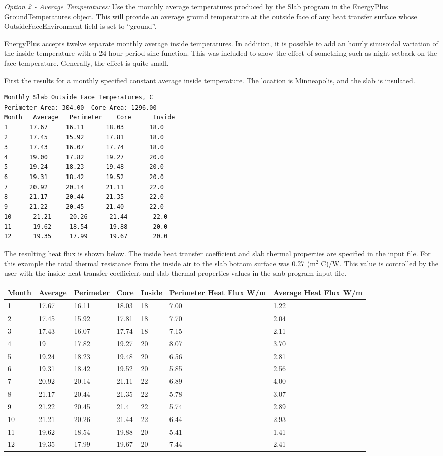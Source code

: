\emph{Option 2 - Average Temperatures:} Use the monthly average temperatures produced by the Slab program in the EnergyPlus GroundTemperatures object. This will provide an average ground temperature at the outside face of any heat transfer surface whose OutsideFaceEnvironment field is set to ``ground''.

EnergyPlus accepts twelve separate monthly average inside temperatures. In addition, it is possible to add an hourly sinusoidal variation of the inside temperature with a 24 hour period sine function. This was included to show the effect of something such as night setback on the face temperature. Generally, the effect is quite small.

First the results for a monthly specified constant average inside temperature. The location is Minneapolis, and the slab is insulated.

\begin{lstlisting}
Monthly Slab Outside Face Temperatures, C
Perimeter Area: 304.00  Core Area: 1296.00
Month   Average   Perimeter    Core      Inside
1      17.67     16.11      18.03       18.0
2      17.45     15.92      17.81       18.0
3      17.43     16.07      17.74       18.0
4      19.00     17.82      19.27       20.0
5      19.24     18.23      19.48       20.0
6      19.31     18.42      19.52       20.0
7      20.92     20.14      21.11       22.0
8      21.17     20.44      21.35       22.0
9      21.22     20.45      21.40       22.0
10      21.21     20.26      21.44       22.0
11      19.62     18.54      19.88       20.0
12      19.35     17.99      19.67       20.0
\end{lstlisting}

The resulting heat flux is shown below. The inside heat transfer coefficient and slab thermal properties are specified in the input file. For this example the total thermal resistance from the inside air to the slab bottom surface was 0.27 (m\(^{2}\) C)/W. This value is controlled by the user with the inside heat transfer coefficient and slab thermal properties values in the slab program input file.

\begin{longtable}[c]{p{0.85in}p{0.85in}p{0.85in}p{0.85in}p{0.85in}p{0.85in}p{0.85in}}
\toprule 
Month & Average & Perimeter & Core & Inside & Perimeter Heat Flux W/m & Average Heat Flux W/m \tabularnewline \midrule
\endhead
1 & 17.67 & 16.11 & 18.03 & 18 & 7.00 & 1.22 \tabularnewline
2 & 17.45 & 15.92 & 17.81 & 18 & 7.70 & 2.04 \tabularnewline
3 & 17.43 & 16.07 & 17.74 & 18 & 7.15 & 2.11 \tabularnewline
4 & 19 & 17.82 & 19.27 & 20 & 8.07 & 3.70 \tabularnewline
5 & 19.24 & 18.23 & 19.48 & 20 & 6.56 & 2.81 \tabularnewline
6 & 19.31 & 18.42 & 19.52 & 20 & 5.85 & 2.56 \tabularnewline
7 & 20.92 & 20.14 & 21.11 & 22 & 6.89 & 4.00 \tabularnewline
8 & 21.17 & 20.44 & 21.35 & 22 & 5.78 & 3.07 \tabularnewline
9 & 21.22 & 20.45 & 21.4 & 22 & 5.74 & 2.89 \tabularnewline
10 & 21.21 & 20.26 & 21.44 & 22 & 6.44 & 2.93 \tabularnewline
11 & 19.62 & 18.54 & 19.88 & 20 & 5.41 & 1.41 \tabularnewline
12 & 19.35 & 17.99 & 19.67 & 20 & 7.44 & 2.41 \tabularnewline
\bottomrule
\end{longtable}
